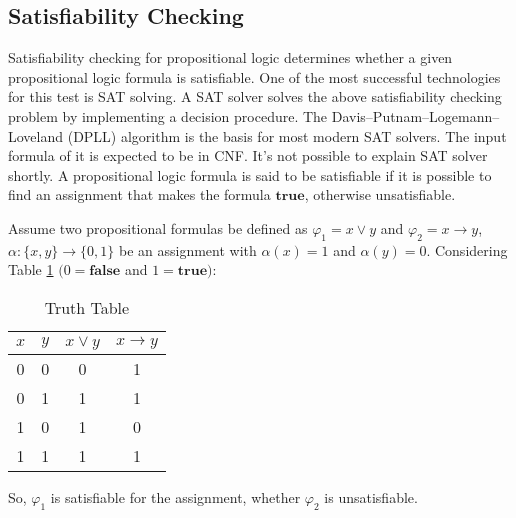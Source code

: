 \subsection{Satisfiability Checking}
Satisfiability checking for propositional logic determines whether a given propositional logic formula is satisfiable. One of the most successful technologies for this test is SAT solving.\newline
A SAT solver solves the above satisfiability checking problem by implementing a decision procedure. The Davis–Putnam–Logemann–Loveland (DPLL) algorithm is the basis for most modern SAT solvers. The input formula of it is expected to be in CNF. It's not possible to explain SAT solver shortly.\newline
A propositional logic formula is said to be satisfiable if it is possible to find an assignment that makes the formula $\mathbf{true}$, otherwise unsatisfiable.
\begin{example}
	Assume two propositional formulas be defined as $\varphi_{1}=x\vee y$ and $\varphi_{2}=x\rightarrow y$, $\alpha : \{x, y\}\rightarrow \{0, 1\}$ be an assignment with $\alpha (x)=1$ and $\alpha (y)=0$. Considering Table \ref{truth-table} $(0=\mathbf{false}$ and $1=\mathbf{true})$:
	\begin{table}[]
		\centering
		\caption{Truth Table}
		\label{truth-table}
		\begin{tabular}{|c|c|c|c|}
			\hline
			$x$ & $y$ & $x \vee y$ & $x\rightarrow y$ \\ \hline
			0   & 0   & 0          & 1                \\ \hline
			0   & 1   & 1          & 1                \\ \hline
			1   & 0   & 1          & 0                \\ \hline
			1   & 1   & 1          & 1                \\ \hline
		\end{tabular}
	\end{table}
	So, $\varphi_{1}$ is satisfiable for the assignment, whether $\varphi_{2}$ is unsatisfiable.
\end{example}
